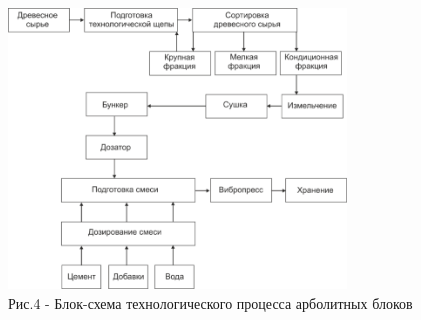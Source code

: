 \begin{figure}[H]
	\centering
	\includegraphics[width=0.8\textwidth]{media/chem/image5}
	\caption*{Рис.4 - Блок-схема технологического процесса арболитных блоков}
\end{figure}

